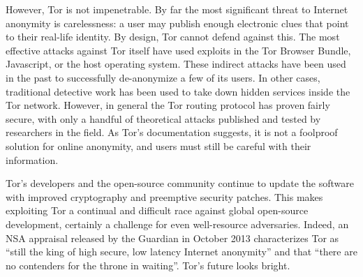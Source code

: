 \documentclass[journal]{IEEEtran}
\begin{document}
However, Tor is not impenetrable. By far the most significant threat to Internet anonymity is carelessness: a user may publish enough electronic clues that point to their real-life identity. By design, Tor cannot defend against this. The most effective attacks against Tor itself have used exploits in the Tor Browser Bundle, Javascript, or the host operating system. These indirect attacks have been used in the past to successfully de-anonymize a few of its users. In other cases, traditional detective work has been used to take down hidden services inside the Tor network. However, in general the Tor routing protocol has proven fairly secure, with only a handful of theoretical attacks published and tested by researchers in the field. As Tor's documentation suggests, it is not a foolproof solution for online anonymity, and users must still be careful with their information.

Tor's developers and the open-source community continue to update the software with improved cryptography and preemptive security patches. This makes exploiting Tor a continual and difficult race against global open-source development, certainly a challenge for even well-resource adversaries. Indeed, an NSA appraisal released by the Guardian in October 2013 characterizes Tor as ``still the king of high secure, low latency Internet anonymity'' and that ``there are no contenders for the throne in waiting''. Tor's future looks bright.

\end{document}
